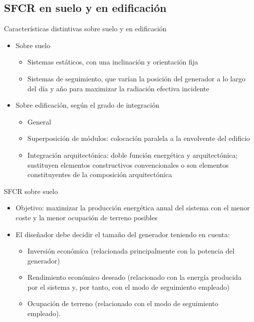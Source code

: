 \documentclass[xcolor={usenames,svgnames,dvipsnames}]{beamer}
\begin{document}
\subsection{SFCR en suelo y en edificación}
\label{sec-1-3}
\begin{frame}[label=sec-1-3-1]{Características distintivas sobre suelo y en edificación}
\begin{itemize}
\item \alert{Sobre suelo}

\begin{itemize}
\item Sistemas estáticos, con una inclinación y orientación fija

\item Sistemas de seguimiento, que varían la posición del generador a lo
largo del día y año para maximizar la radiación efectiva incidente
\end{itemize}

\item \alert{Sobre edificación}, según el grado de integración

\begin{itemize}
\item General

\item Superposición de módulos: colocación paralela a la envolvente del
edificio

\item Integración arquitectónica: doble función energética y
arquitectónica; sustituyen elementos constructivos convencionales
o son elementos constituyentes de la composición arquitectónica
\end{itemize}
\end{itemize}
\end{frame}


\begin{frame}[label=sec-1-3-2]{SFCR sobre suelo}
\begin{itemize}
\item \alert{Objetivo}: maximizar la producción energética anual del sistema con
el menor coste y la menor ocupación de terreno posibles

\item El diseñador debe decidir el tamaño del generador teniendo en cuenta:

\begin{itemize}
\item Inversión económica (relacionada principalmente con la potencia
del generador)

\item Rendimiento económico deseado (relacionado con la energía
producida por el sistema y, por tanto, con el modo de seguimiento
empleado)

\item Ocupación de terreno (relacionado con el modo de seguimiento
empleado).
\end{itemize}
\end{itemize}
\end{frame}
\end{document}

